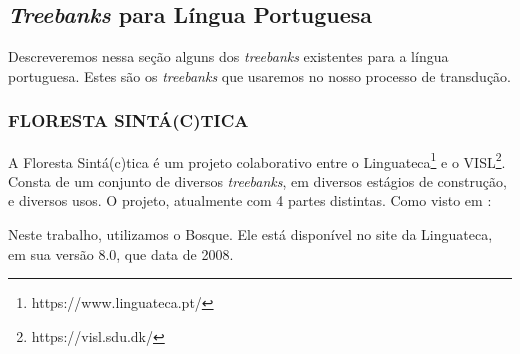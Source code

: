 \subsection{\textit{Treebanks} para Língua Portuguesa}
\label{subsec:tbPortugues}
Descreveremos nessa seção alguns dos \textit{treebanks} existentes para a língua portuguesa. Estes são os \textit{treebanks} que usaremos no nosso processo de transdução.

\subsubsection{FLORESTA SINTÁ(C)TICA}
\label{subsubsec:florestasintatica}

A Floresta Sintá(c)tica é um projeto colaborativo entre o Linguateca\footnote{https://www.linguateca.pt/} e o VISL\footnote{https://visl.sdu.dk/}. Consta de um conjunto de diversos \textit{treebanks}, em diversos estágios de construção, e diversos usos. O projeto, atualmente com 4 partes distintas. Como visto em \cite{linguatecaFloresta}:
\begin{quote}
\end{quote}

Neste trabalho, utilizamos o Bosque. Ele está disponível no site da Linguateca, em sua versão 8.0, que data de 2008. 

